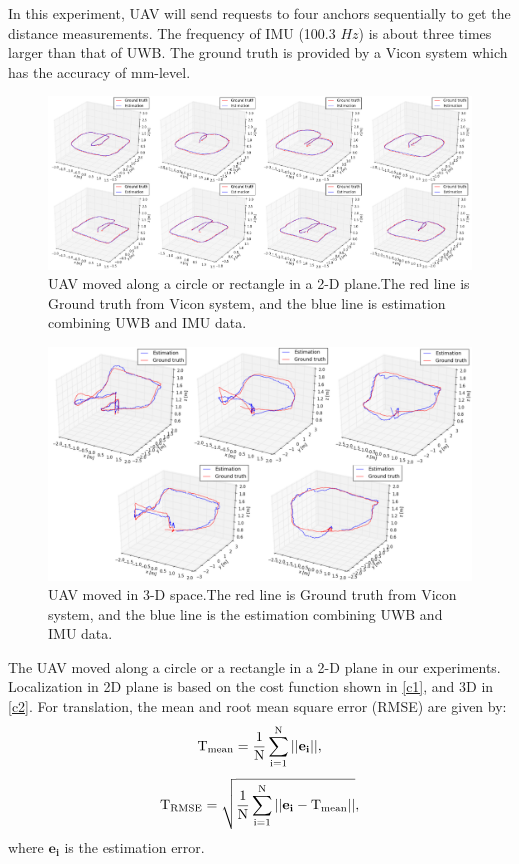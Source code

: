 \documentclass[journal]{IEEEtran}
\begin{document}
In this experiment, UAV will send requests to four anchors sequentially to get the distance measurements. The frequency of IMU (100.3 $Hz$) is about three times larger than that of UWB. The ground truth is provided by a Vicon system which has the accuracy of mm-level.  

\begin{figure}[!t]
\centering
\includegraphics[width=1\linewidth]{pic/2d.pdf}
\caption{UAV moved along a circle or rectangle in a 2-D plane.The red line is Ground truth from Vicon system, and the blue line is estimation combining UWB and IMU data. }
\label{fig8}
\end{figure}

\begin{figure}[!t]
\centering
\includegraphics[width=0.8\linewidth]{pic/3d.png}
\centering
\caption{UAV moved in 3-D space.The red line is Ground truth from Vicon system, and the blue line is the estimation combining UWB and IMU data. }
\label{fig9}
\end{figure}

The UAV moved along a circle or a rectangle in a 2-D plane in our experiments. Localization in 2D plane is based on the cost function shown in \eqref{c1}, and 3D in \eqref{c2}. For translation, the mean and root mean square error (RMSE) are given by:
\begin{equation}
   \rm T_{mean} = \frac{1}{N}\sum_{i=1}^{N}||\mathbf{e_i}||,
\end{equation}
\begin{equation}\label{1123}
   \rm T_{RMSE} =\sqrt{ \frac{1}{N}\sum_{i=1}^{N}||\mathbf{e_i} - \rm T_{mean}||},
\end{equation}
where $\mathbf{e_i}$ is the estimation error.
\end{document}
